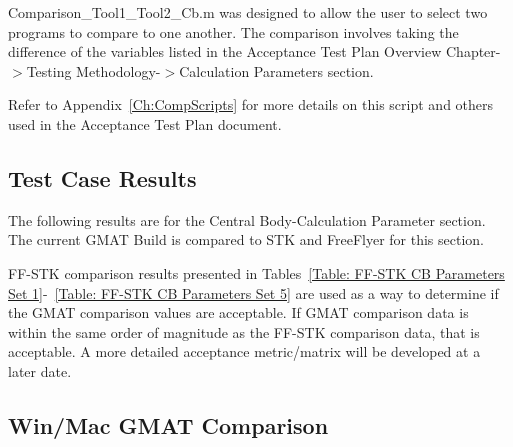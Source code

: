 Comparison\_Tool1\_Tool2\_Cb.m was designed to allow the user to
select two programs to compare to one another. The comparison
involves taking the difference of the variables listed in the
Acceptance Test Plan Overview Chapter-$>$Testing
Methodology-$>$Calculation Parameters section.

Refer to Appendix~\ref{Ch:CompScripts} for more details on this
script and others used in the Acceptance Test Plan document.

\subsection{Test Case Results}
The following results are for the Central Body-Calculation Parameter
section. The current GMAT Build is compared to STK and
FreeFlyer for this section.

FF-STK comparison results presented in Tables~\ref{Table: FF-STK CB
Parameters Set 1}-~\ref{Table: FF-STK CB Parameters Set 5} are used
as a way to determine if the GMAT comparison values are acceptable.
If GMAT comparison data is within the same order of magnitude as the
FF-STK comparison data, that is acceptable. A more detailed
acceptance metric/matrix will be developed at a later date.

\clearpage

\clearpage

\clearpage

\subsection{Win/Mac GMAT Comparison}





\clearpage

